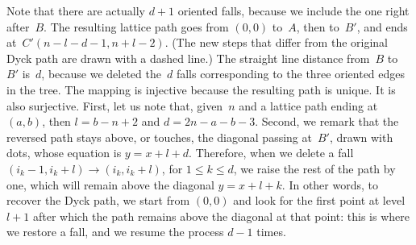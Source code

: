 Note that there are actually \(d+1\) oriented falls, because we
include the one right after~\(B\). The resulting lattice path goes
from \((0,0)\) to~\(A\), then to~\(B'\), and ends
at~\(C'(n-l-d-1,n+l-2)\). (The new steps that differ from the original
Dyck path are drawn with a dashed line.) The straight line distance
from~\(B\) to~\(B'\) is~\(d\), because we deleted the~\(d\) falls
corresponding to the three oriented edges in the tree. The mapping is
injective because the resulting path is unique. It is also
surjective. First, let us note that, given~\(n\) and a lattice path
ending at \((a,b)\), then \(l=b-n+2\) and \(d=2n-a-b-3\). Second, we
remark that the reversed path stays above, or touches, the diagonal
passing at~\(B'\), drawn with dots, whose equation is
\(y=x+l+d\). Therefore, when we delete a fall \((i_k-1,i_k+l)
\rightarrow (i_k,i_k+l)\), for \(1 \leqslant k \leqslant d\), we raise
the rest of the path by one, which will remain above the diagonal
\(y=x+l+k\). In other words, to recover the Dyck path, we start from
\((0,0)\) and look for the first point at level~\(l+1\) after which
the path remains above the diagonal at that point: this is where we
restore a fall, and we resume the process \(d-1\) times.

